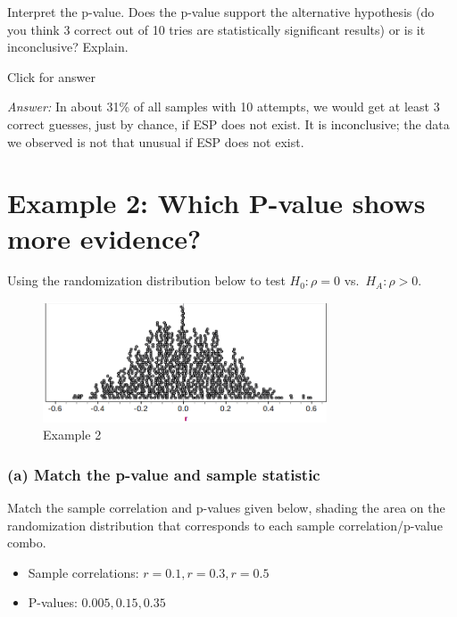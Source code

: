 \documentclass[
]{book}
\providecommand{\tightlist}{%
  \setlength{\itemsep}{0pt}\setlength{\parskip}{0pt}}
\begin{document}
Interpret the p-value. Does the p-value support the alternative hypothesis (do you think 3 correct out of 10 tries are statistically significant results) or is it inconclusive? Explain.

Click for answer

\emph{Answer:} In about 31\% of all samples with 10 attempts, we would get at least 3 correct guesses, just by chance, if ESP does not exist. It is inconclusive; the data we observed is not that unusual if ESP does not exist.

\hypertarget{example-2-which-p-value-shows-more-evidence}{%
\section{Example 2: Which P-value shows more evidence?}\label{example-2-which-p-value-shows-more-evidence}}

Using the randomization distribution below to test \(H_0: \rho = 0\) vs.~\(H_A: \rho > 0\).

\begin{figure}
\centering
\includegraphics[width=0.75\textwidth,height=\textheight]{data/corRand.png}
\caption{Example 2}
\end{figure}

\hypertarget{a-match-the-p-value-and-sample-statistic}{%
\subsubsection{(a) Match the p-value and sample statistic}\label{a-match-the-p-value-and-sample-statistic}}

Match the sample correlation and p-values given below, shading the area on the randomization distribution that corresponds to each sample correlation/p-value combo.

\begin{itemize}
\tightlist
\item
  Sample correlations: \(r = 0.1, r=0.3, r = 0.5\)
\item
  P-values: \(0.005, 0.15, 0.35\)
\end{itemize}
\end{document}
